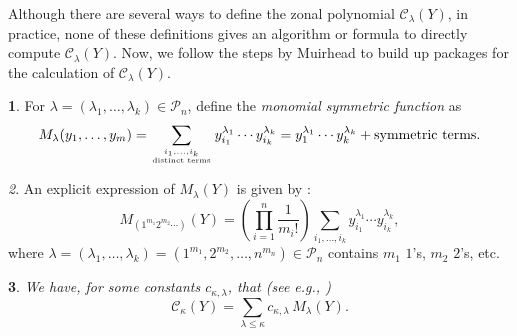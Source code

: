 \documentclass{mathincs}
\numberwithin{equation}{section}
\numberwithin{figure}{section}
\theoremstyle{plain}
\newtheorem{thm}{\protect\theoremname}[section]
\theoremstyle{definition}
\newtheorem{defn}[thm]{\protect\definitionname}
\theoremstyle{remark}
\newtheorem{rem}[thm]{\protect\remarkname}
\theoremstyle{plain}
\theoremstyle{definition}
\newtheorem{example}[thm]{\protect\examplename}
\theoremstyle{plain}
\theoremstyle{plain}
\newcommand{\SPD}{\operatorname{SPD}}
\providecommand{\definitionname}{Definition}
\providecommand{\examplename}{Example}
\providecommand{\remarkname}{Remark}
\providecommand{\theoremname}{Theorem}
\begin{document}
Although there are several ways to define the zonal polynomial $\mathcal{C}_{\lambda}(Y)$,
in practice, none of these definitions gives an algorithm or formula
to directly compute $\mathcal{C}_{\lambda}(Y)$. Now, we
follow the steps by Muirhead \cite{Muirhead} to build up packages for the
calculation of $\mathcal{C}_{\lambda}(Y)$.
\begin{defn}
For $\lambda=(\lambda_1,\ldots,\lambda_k)\in\mathcal{P}_{n}$,
define the \emph{monomial symmetric function} as 
\begin{equation}
  M_{\lambda}(y_{1},\ldots,y_{m}) =
  \sum_{\genfrac{}{}{0pt}{}{i_{1},\ldots,i_{k}}{\text{distinct terms}}}y_{i_{1}}^{\lambda_{1}}\cdots y_{i_{k}}^{\lambda_{k}}=y_{1}^{\lambda_{1}}\cdots y_{k}^{\lambda_{k}}+\text{symmetric terms}.\label{eq:MZonal}
\end{equation}
\end{defn}
\begin{rem}
An explicit expression of $M_{\lambda}(Y)$ is given by
\cite[eq.~6]{Takemura}:
\begin{equation}\label{eq:MZonalComputation}
  M_{(1^{m_{1}}2^{m_{2}}\cdots)}(Y)=\left(\prod_{i=1}^{n}\frac{1}{m_{i}!}\right)
  \sum_{i_{1},\ldots,i_{k}}y_{i_{1}}^{\lambda_{1}}\cdots y_{i_{k}}^{\lambda_{k}},
\end{equation}
where $\lambda=(\lambda_1,\ldots,\lambda_k)=(1^{m_1},2^{m_2},\ldots,n^{m_n})\in\mathcal{P}_n$ contains $m_1$ $1$'s, $m_2$ $2$'s, etc. 
\end{rem}
\begin{thm}
We have,  for some constants $c_{\kappa,\lambda}$, that (see e.g., \cite[eq.~13]{Muirhead})
\begin{equation}\label{eq:CInTermsOfM}
  \mathcal{C}_{\kappa}(Y)=\sum_{\lambda\leq\kappa}c_{\kappa,\lambda}\,M_{\lambda}(Y).
\end{equation}
\end{thm}
\end{document}
